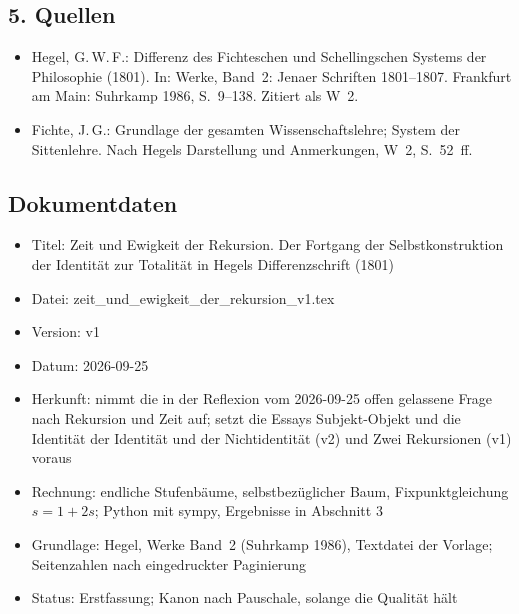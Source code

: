 \documentclass[11pt,a4paper]{article}
\begin{document}
\subsection*{5. Quellen}
\begin{itemize}
\item Hegel, G.\,W.\,F.: Differenz des Fichteschen und Schellingschen Systems der Philosophie (1801). In: Werke, Band~2: Jenaer Schriften 1801--1807. Frankfurt am Main: Suhrkamp 1986, S.~9--138. Zitiert als W~2.
\item Fichte, J.\,G.: Grundlage der gesamten Wissenschaftslehre; System der Sittenlehre. Nach Hegels Darstellung und Anmerkungen, W~2, S.~52~ff.
\end{itemize}

\subsection*{Dokumentdaten}
\begin{itemize}
\item Titel: Zeit und Ewigkeit der Rekursion. Der Fortgang der Selbstkonstruktion der Identität zur Totalität in Hegels Differenzschrift (1801)
\item Datei: zeit\_und\_ewigkeit\_der\_rekursion\_v1.tex
\item Version: v1
\item Datum: 2026-09-25
\item Herkunft: nimmt die in der Reflexion vom 2026-09-25 offen gelassene Frage nach Rekursion und Zeit auf; setzt die Essays \glqq Subjekt-Objekt und die Identität der Identität und der Nichtidentität\grqq{} (v2) und \glqq Zwei Rekursionen\grqq{} (v1) voraus
\item Rechnung: endliche Stufenbäume, selbstbezüglicher Baum, Fixpunktgleichung $s = 1 + 2s$; Python mit sympy, Ergebnisse in Abschnitt 3
\item Grundlage: Hegel, Werke Band~2 (Suhrkamp 1986), Textdatei der Vorlage; Seitenzahlen nach eingedruckter Paginierung
\item Status: Erstfassung; Kanon nach Pauschale, solange die Qualität hält
\end{itemize}
\end{document}

